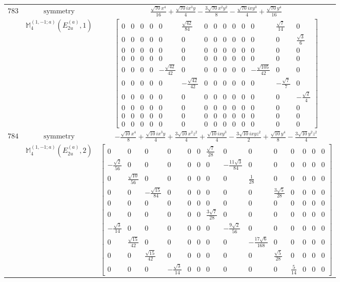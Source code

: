 \documentclass[fleqn,8pt,landscape]{jsarticle}
\begin{document}
\begin{longtable}{ccc}
$ 783 $ & $ \text{symmetry} $ & $ \frac{\sqrt{70} x^{4}}{16} + \frac{\sqrt{70} i x^{3} y}{4} - \frac{3 \sqrt{70} x^{2} y^{2}}{8} - \frac{\sqrt{70} i x y^{3}}{4} + \frac{\sqrt{70} y^{4}}{16} $ \\
$  $ & $ \mathbb{M}_{4}^{(1,-1;a)}(E_{2u}^{(a)},1) $ & $ \begin{bmatrix} 0 & 0 & 0 & 0 & 0 & \frac{\sqrt{42}}{84} & 0 & 0 & 0 & 0 & 0 & 0 & \frac{\sqrt{7}}{14} & 0 \\ 0 & 0 & 0 & 0 & 0 & 0 & 0 & 0 & 0 & 0 & 0 & 0 & 0 & \frac{\sqrt{3}}{6} \\ 0 & 0 & 0 & 0 & 0 & 0 & 0 & 0 & 0 & 0 & 0 & 0 & 0 & 0 \\ 0 & 0 & 0 & 0 & 0 & 0 & 0 & 0 & 0 & 0 & 0 & 0 & 0 & 0 \\ 0 & 0 & 0 & 0 & - \frac{\sqrt{42}}{42} & 0 & 0 & 0 & 0 & 0 & 0 & - \frac{\sqrt{105}}{42} & 0 & 0 \\ 0 & 0 & 0 & 0 & 0 & - \frac{\sqrt{42}}{42} & 0 & 0 & 0 & 0 & 0 & 0 & - \frac{\sqrt{7}}{7} & 0 \\ 0 & 0 & 0 & 0 & 0 & 0 & 0 & 0 & 0 & 0 & 0 & 0 & 0 & - \frac{\sqrt{2}}{4} \\ 0 & 0 & 0 & 0 & 0 & 0 & 0 & 0 & 0 & 0 & 0 & 0 & 0 & 0 \\ 0 & 0 & 0 & 0 & 0 & 0 & 0 & 0 & 0 & 0 & 0 & 0 & 0 & 0 \\ 0 & 0 & 0 & 0 & 0 & 0 & 0 & 0 & 0 & 0 & 0 & 0 & 0 & 0 \end{bmatrix} $ \\ \hline
$ 784 $ & $ \text{symmetry} $ & $ - \frac{\sqrt{10} x^{4}}{8} + \frac{\sqrt{10} i x^{3} y}{4} + \frac{3 \sqrt{10} x^{2} z^{2}}{4} + \frac{\sqrt{10} i x y^{3}}{4} - \frac{3 \sqrt{10} i x y z^{2}}{2} + \frac{\sqrt{10} y^{4}}{8} - \frac{3 \sqrt{10} y^{2} z^{2}}{4} $ \\
$  $ & $ \mathbb{M}_{4}^{(1,-1;a)}(E_{2u}^{(a)},2) $ & $ \begin{bmatrix} 0 & 0 & 0 & 0 & 0 & 0 & \frac{\sqrt{7}}{28} & 0 & 0 & 0 & 0 & 0 & 0 & 0 \\ - \frac{\sqrt{2}}{56} & 0 & 0 & 0 & 0 & 0 & 0 & - \frac{11 \sqrt{3}}{84} & 0 & 0 & 0 & 0 & 0 & 0 \\ 0 & \frac{\sqrt{10}}{56} & 0 & 0 & 0 & 0 & 0 & 0 & \frac{1}{28} & 0 & 0 & 0 & 0 & 0 \\ 0 & 0 & - \frac{\sqrt{15}}{84} & 0 & 0 & 0 & 0 & 0 & 0 & \frac{3 \sqrt{5}}{28} & 0 & 0 & 0 & 0 \\ 0 & 0 & 0 & 0 & 0 & 0 & 0 & 0 & 0 & 0 & 0 & 0 & 0 & 0 \\ 0 & 0 & 0 & 0 & 0 & 0 & \frac{3 \sqrt{7}}{28} & 0 & 0 & 0 & 0 & 0 & 0 & 0 \\ - \frac{\sqrt{3}}{14} & 0 & 0 & 0 & 0 & 0 & 0 & - \frac{9 \sqrt{2}}{56} & 0 & 0 & 0 & 0 & 0 & 0 \\ 0 & \frac{\sqrt{15}}{42} & 0 & 0 & 0 & 0 & 0 & 0 & - \frac{17 \sqrt{6}}{168} & 0 & 0 & 0 & 0 & 0 \\ 0 & 0 & \frac{\sqrt{15}}{42} & 0 & 0 & 0 & 0 & 0 & 0 & \frac{\sqrt{5}}{28} & 0 & 0 & 0 & 0 \\ 0 & 0 & 0 & - \frac{\sqrt{3}}{14} & 0 & 0 & 0 & 0 & 0 & 0 & \frac{5}{14} & 0 & 0 & 0 \end{bmatrix} $ \\ \hline

\end{longtable}
\end{document}
